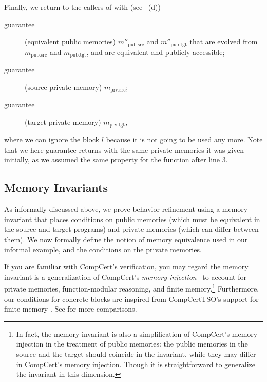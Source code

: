 Finally, we return to the callers of  with (see ~(d))
\begin{description}
\item[guarantee] (equivalent public memories) 
  $m''_\textrm{pub:src}$ and $m''_\textrm{pub:tgt}$
  that are evolved from $m_\textrm{pub:src}$ and $m_\textrm{pub:tgt}$,
  and are equivalent and publicly accessible;
\item[guarantee] (source private memory) 
  $m_\textrm{prv:src}$;
\item[guarantee] (target private memory) 
  $m_\textrm{prv:tgt}$,
\end{description}
where we can ignore the block $l$ because it is not going to be used any more.
Note that we here guarantee  returns with the same private memories it was given
initially, as we assumed the same property for the function
 after line 3.

\subsection{Memory Invariants}
\label{reasoning:invariants}

As informally discussed above, we prove behavior refinement using a memory invariant that places
conditions on public memories (which must be equivalent in the source and target programs) and
private memories (which can differ between them).  We now formally define the notion of memory
equivalence used in our informal example, and the conditions on the private memories.

If you are familiar with CompCert's verification, you may regard the memory invariant is a
generalization of CompCert's \emph{memory injection}~\cite{Leroy-Appel-Blazy-Stewart-memory-v2} to
account for private memories, function-modular reasoning, and finite memory.\footnote{In fact, the
  memory invariant is also a simplification of CompCert's memory injection in the treatment of
  public memories: the public memories in the source and the target should coincide in the
  invariant, while they may differ in CompCert's memory injection.  Though it is straightforward to
  generalize the invariant in this dimension.}  Furthermore, our conditions for concrete blocks are
inspired from CompCertTSO's support for finite memory \cite{vsevvcik2013compcerttso}.  See
 for more comparisons.


